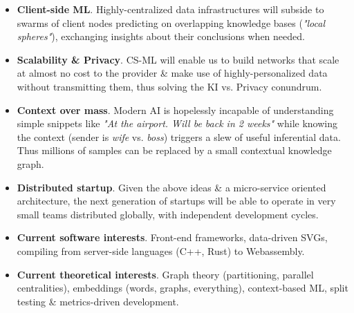 \documentclass[a4paper]{twentysecondcv} %
\begin{document}
\begin{itemize}	
	\item \textbf{Client-side ML}. Highly-centralized data infrastructures will subside to swarms of client nodes predicting on overlapping knowledge bases (\emph{"local spheres"}), exchanging insights about their conclusions when needed.
	
	\item \textbf{Scalability \& Privacy}. CS-ML will enable us to build networks that scale at almost no cost to the provider \& make use of highly-personalized data without transmitting them, thus solving the KI vs. Privacy conundrum.
	
	\item \textbf{Context over mass}. Modern AI is hopelessly incapable of understanding simple snippets like \emph{"At the airport. Will be back in 2 weeks"} while knowing the context (sender is \emph{wife} vs. \emph{boss}) triggers a slew of useful inferential data. Thus millions of samples can be replaced by a small contextual knowledge graph.
	
	\item \textbf{Distributed startup}. Given the above ideas \& a micro-service oriented architecture, the next generation of startups will be able to operate in very small teams distributed globally, with independent development cycles.
	
	\item \textbf{Current software interests}. Front-end frameworks, data-driven SVGs, compiling from server-side languages (C++, Rust) to Webassembly.
	
	\item \textbf{Current theoretical interests}. Graph theory (partitioning, parallel centralities), embeddings (words, graphs, everything), context-based ML, split testing \& metrics-driven development.
	
\end{itemize}



\end{document}
